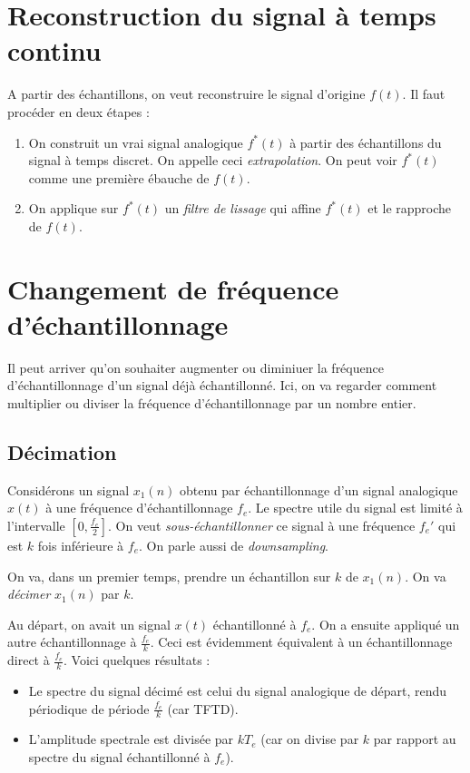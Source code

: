     \section{Reconstruction du signal à temps continu}
        A partir des échantillons, on veut reconstruire le signal d'origine $f(t)$. Il faut procéder en deux étapes :
        \begin{enumerate}
            \item On construit un vrai signal analogique $f^*(t)$ à partir des échantillons du signal à temps discret. On appelle ceci \textit{extrapolation}. On peut voir $f^*(t)$ comme une première ébauche de $f(t)$.
            \item On applique sur $f^*(t)$ un \textit{filtre de lissage} qui affine $f^*(t)$ et le rapproche de $f(t)$.
        \end{enumerate}


    \section{Changement de fréquence d'échantillonnage}
        Il peut arriver qu'on souhaiter augmenter ou diminiuer la fréquence d'échantillonnage d'un signal déjà échantillonné. Ici, on va regarder comment multiplier ou diviser la fréquence d'échantillonnage par un nombre entier.

        \subsection{Décimation}
            Considérons un signal $x_1(n)$ obtenu par échantillonnage d'un signal analogique $x(t)$ à une fréquence d'échantillonnage $f_e$. Le spectre utile du signal est limité à l'intervalle $[0, \frac{f_e}{2}]$. On veut \textit{sous-échantillonner} ce signal à une fréquence $f_e'$ qui est $k$ fois inférieure à $f_e$. On parle aussi de \textit{downsampling}.

            On va, dans un premier temps, prendre un échantillon sur $k$ de $x_1(n)$. On va \textit{décimer} $x_1(n)$ par $k$.

            Au départ, on avait un signal $x(t)$ échantillonné à $f_e$. On a ensuite appliqué un autre échantillonnage à $\frac{f_e}{k}$. Ceci est évidemment équivalent à un échantillonnage direct à $\frac{f_e}{k}$. Voici quelques résultats :
            \begin{itemize}
                \item Le spectre du signal décimé est celui du signal analogique de départ, rendu périodique de période $\frac{f_e}{k}$ (car TFTD).
                \item L'amplitude spectrale est divisée par $kT_e$ (car on divise par $k$ par rapport au spectre du signal échantillonné à $f_e$).
            \end{itemize}

